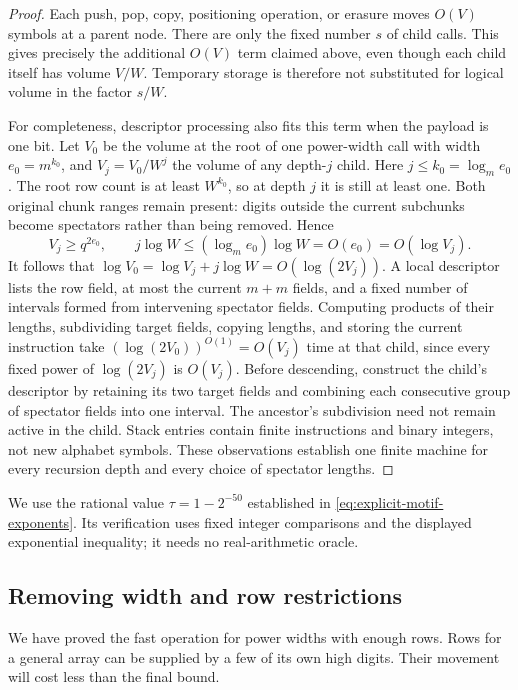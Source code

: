\documentclass[11pt]{article}
\theoremstyle{definition}
\begin{document}
\begin{proof}
Each push, pop, copy, positioning operation, or erasure moves $O(V)$
symbols at a parent node.  There are only the fixed number $s$ of child
calls.  This gives precisely the additional $O(V)$ term claimed above,
even though each child itself has volume $V/W$.  Temporary storage is
therefore not substituted for logical volume in the factor $s/W$.

For completeness, descriptor processing also fits this term when the
payload is one bit.  Let $V_0$ be the volume at the root of one
power-width call with width $e_0=m^{k_0}$, and $V_j=V_0/W^j$ the volume
of any depth-$j$ child.  Here $j\le k_0=\log_m e_0$.  The root row
count is at least $W^{k_0}$, so at depth $j$ it is still at least one.
Both original chunk ranges remain present: digits outside the current
subchunks become spectators rather than being removed.  Hence
\[
 V_j\ge q^{2e_0},\qquad
 j\log W\le(\log_m e_0)\log W=O(e_0)=O(\log V_j).
\]
It follows that
$\log V_0=\log V_j+j\log W=O(\log(2V_j))$.
A local descriptor lists the row field, at most the current $m+m$
fields, and a fixed number of intervals formed from intervening
spectator fields.  Computing products of their lengths, subdividing
target fields, copying lengths, and storing the current instruction take
$(\log(2V_0))^{O(1)}=O(V_j)$ time at that child, since every fixed
power of $\log(2V_j)$ is $O(V_j)$.  Before descending,
construct the child's descriptor by retaining its two target fields and
combining each consecutive group of spectator fields into one interval.
The ancestor's subdivision need not remain active in the child.  Stack entries contain
finite instructions and binary integers, not new alphabet symbols.
These observations establish one finite machine for every recursion
depth and every choice of spectator lengths.

\end{proof}


We use the rational value $\tau=1-2^{-50}$ established in
\eqref{eq:explicit-motif-exponents}. Its verification uses fixed integer
comparisons and the displayed exponential inequality; it needs no
real-arithmetic oracle.


\subsection{Removing width and row restrictions}

We have proved the fast operation for power widths with enough rows.
Rows for a general array can be supplied by a few of its own high digits.
Their movement will cost less than the final bound.
\end{document}
